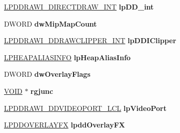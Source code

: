 \begin{DoxyCompactItemize}
\hyperlink{struct___d_d_r_a_w_i___d_i_r_e_c_t_d_r_a_w___i_n_t}{L\+P\+D\+D\+R\+A\+W\+I\+\_\+\+D\+I\+R\+E\+C\+T\+D\+R\+A\+W\+\_\+\+I\+NT} {\bfseries lp\+D\+D\+\_\+int}
\item 
\mbox{\label{struct___d_d_r_a_w_i___d_d_r_a_w_s_u_r_f_a_c_e___m_o_r_e_aa9058424975897195bc52f2e60f79041}} 
D\+W\+O\+RD {\bfseries dw\+Mip\+Map\+Count}
\item 
\mbox{\label{struct___d_d_r_a_w_i___d_d_r_a_w_s_u_r_f_a_c_e___m_o_r_e_a6f984d8583965177a21f9bafd037b192}} 
\hyperlink{struct___d_d_r_a_w_i___d_d_r_a_w_c_l_i_p_p_e_r___i_n_t}{L\+P\+D\+D\+R\+A\+W\+I\+\_\+\+D\+D\+R\+A\+W\+C\+L\+I\+P\+P\+E\+R\+\_\+\+I\+NT} {\bfseries lp\+D\+D\+I\+Clipper}
\item 
\mbox{\label{struct___d_d_r_a_w_i___d_d_r_a_w_s_u_r_f_a_c_e___m_o_r_e_a0c766920102d41d393c225456f723c20}} 
\hyperlink{struct___h_e_a_p_a_l_i_a_s_i_n_f_o}{L\+P\+H\+E\+A\+P\+A\+L\+I\+A\+S\+I\+N\+FO} {\bfseries lp\+Heap\+Alias\+Info}
\item 
\mbox{\label{struct___d_d_r_a_w_i___d_d_r_a_w_s_u_r_f_a_c_e___m_o_r_e_a7bbffcbf781d1c208f0f3151c6226c70}} 
D\+W\+O\+RD {\bfseries dw\+Overlay\+Flags}
\item 
\mbox{\label{struct___d_d_r_a_w_i___d_d_r_a_w_s_u_r_f_a_c_e___m_o_r_e_a32ef66b4882892348e80dc8b37da2c6a}} 
\hyperlink{interfacevoid}{V\+O\+ID} $\ast$ {\bfseries rgjunc}
\item 
\mbox{\label{struct___d_d_r_a_w_i___d_d_r_a_w_s_u_r_f_a_c_e___m_o_r_e_ada7f8ec59ac09c987b5768de44e12dda}} 
\hyperlink{struct___d_d_r_a_w_i___d_d_v_i_d_e_o_p_o_r_t___l_c_l}{L\+P\+D\+D\+R\+A\+W\+I\+\_\+\+D\+D\+V\+I\+D\+E\+O\+P\+O\+R\+T\+\_\+\+L\+CL} {\bfseries lp\+Video\+Port}
\item 
\mbox{\label{struct___d_d_r_a_w_i___d_d_r_a_w_s_u_r_f_a_c_e___m_o_r_e_a4f66c295adce093a40eb0354d2020aed}} 
\hyperlink{struct___d_d_o_v_e_r_l_a_y_f_x}{L\+P\+D\+D\+O\+V\+E\+R\+L\+A\+Y\+FX} {\bfseries lpdd\+Overlay\+FX}

\end{DoxyCompactItemize}
